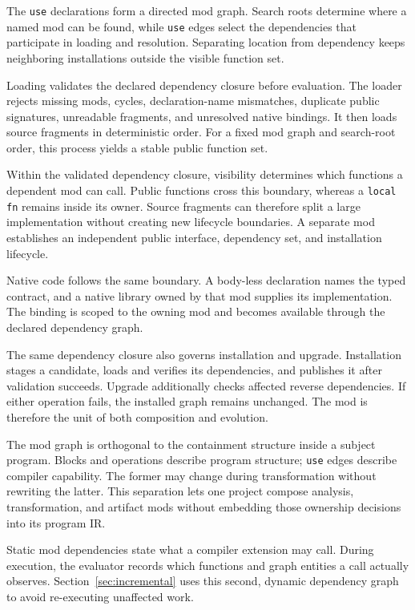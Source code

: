 The \texttt{use} declarations form a directed mod graph. Search roots determine
where a named mod can be found, while \texttt{use} edges select the dependencies
that participate in loading and resolution. Separating location from dependency
keeps neighboring installations outside the visible function set.

Loading validates the declared dependency closure before evaluation. The loader
rejects missing mods, cycles, declaration-name mismatches, duplicate public
signatures, unreadable fragments, and unresolved native bindings. It then loads
source fragments in deterministic order. For a fixed mod graph and search-root
order, this process yields a stable public function set.

Within the validated dependency closure, visibility determines which
functions a dependent mod can call. Public functions cross this boundary,
whereas a \texttt{local fn} remains inside its owner. Source fragments can therefore
split a large implementation without creating new lifecycle boundaries.
A separate mod establishes an independent public interface, dependency set,
and installation lifecycle.

Native code follows the same boundary. A body-less declaration names the typed
contract, and a native library owned by that mod supplies its implementation.
The binding is scoped to the owning mod and becomes available through the
declared dependency graph.

The same dependency closure also governs installation and upgrade.
Installation stages a candidate, loads and verifies its dependencies, and
publishes it after validation succeeds. Upgrade additionally checks affected
reverse dependencies. If either operation fails, the installed graph remains
unchanged. The mod is therefore the unit of both composition and evolution.

The mod graph is orthogonal to the containment structure inside a subject
program. Blocks and operations describe program structure; \texttt{use} edges
describe compiler capability. The former may change during transformation
without rewriting the latter. This separation lets one project compose
analysis, transformation, and artifact mods without embedding those ownership
decisions into its program IR.

Static mod dependencies state what a compiler extension may call. During
execution, the evaluator records which functions and
graph entities a call actually observes. Section~\ref{sec:incremental} uses this
second, dynamic dependency graph to avoid re-executing unaffected work.

